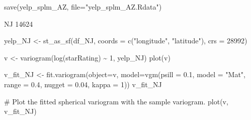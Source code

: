 \documentclass[
  12pt,
  letterpaper,
  DIV=11,
  numbers=noendperiod]{scrartcl}
\newenvironment{Shaded}{\begin{snugshade}}{\end{snugshade}}
\newcommand{\AttributeTok}[1]{\textcolor[rgb]{0.98,0.46,0.51}{#1}}
\newcommand{\CommentTok}[1]{\textcolor[rgb]{0.42,0.45,0.49}{#1}}
\newcommand{\DecValTok}[1]{\textcolor[rgb]{0.47,0.72,1.00}{#1}}
\newcommand{\FloatTok}[1]{\textcolor[rgb]{0.47,0.72,1.00}{#1}}
\newcommand{\FunctionTok}[1]{\textcolor[rgb]{0.70,0.57,0.94}{#1}}
\newcommand{\NormalTok}[1]{\textcolor[rgb]{0.88,0.89,0.91}{#1}}
\newcommand{\OtherTok}[1]{\textcolor[rgb]{0.70,0.57,0.94}{#1}}
\newcommand{\SpecialCharTok}[1]{\textcolor[rgb]{0.47,0.72,1.00}{#1}}
\newcommand{\StringTok}[1]{\textcolor[rgb]{0.62,0.80,1.00}{#1}}
\begin{document}
\begin{Shaded}
\begin{Highlighting}[]
\FunctionTok{save}\NormalTok{(yelp\_splm\_AZ, }\AttributeTok{file=}\StringTok{"yelp\_splm\_AZ.Rdata"}\NormalTok{)}
\end{Highlighting}
\end{Shaded}

NJ 14624

\begin{Shaded}
\begin{Highlighting}[]
\NormalTok{yelp\_NJ }\OtherTok{\textless{}{-}} \FunctionTok{st\_as\_sf}\NormalTok{(df\_NJ, }\AttributeTok{coords =} \FunctionTok{c}\NormalTok{(}\StringTok{"longitude"}\NormalTok{, }\StringTok{"latitude"}\NormalTok{), }\AttributeTok{crs =} \DecValTok{28992}\NormalTok{)}
\end{Highlighting}
\end{Shaded}

\begin{Shaded}
\begin{Highlighting}[]
\NormalTok{v }\OtherTok{\textless{}{-}} \FunctionTok{variogram}\NormalTok{(}\FunctionTok{log}\NormalTok{(starRating) }\SpecialCharTok{\textasciitilde{}} \DecValTok{1}\NormalTok{, yelp\_NJ)}
\FunctionTok{plot}\NormalTok{(v)}
\end{Highlighting}
\end{Shaded}

\begin{Shaded}
\begin{Highlighting}[]
\NormalTok{v\_fit\_NJ }\OtherTok{\textless{}{-}} \FunctionTok{fit.variogram}\NormalTok{(}\AttributeTok{object=}\NormalTok{v, }
                           \AttributeTok{model=}\FunctionTok{vgm}\NormalTok{(}\AttributeTok{psill =} \FloatTok{0.1}\NormalTok{, }\AttributeTok{model =} \StringTok{"Mat"}\NormalTok{, }
                                     \AttributeTok{range =} \FloatTok{0.4}\NormalTok{, }\AttributeTok{nugget =} \FloatTok{0.04}\NormalTok{, }\AttributeTok{kappa =} \DecValTok{1}\NormalTok{))}
\NormalTok{v\_fit\_NJ}

\CommentTok{\# Plot the fitted spherical variogram with the sample variogram.}
\FunctionTok{plot}\NormalTok{(v, v\_fit\_NJ)}
\end{Highlighting}
\end{Shaded}
\end{document}
